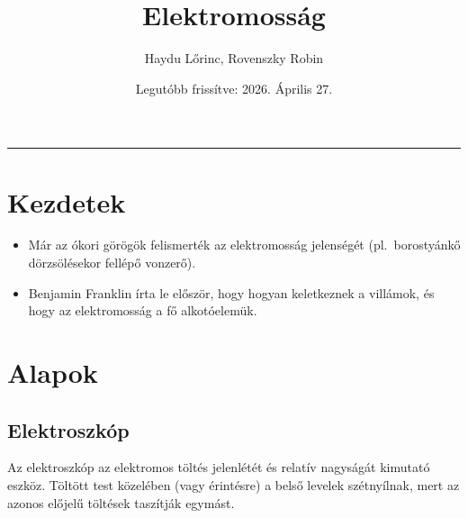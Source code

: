 \documentclass{article}
\title{\textbf{Elektromosság}}
\author{Haydu Lőrinc, Rovenszky Robin}
\date{Legutóbb frissítve: 2026. Április 27.}
\theoremstyle{definition}
\begin{document}
\maketitle
\tableofcontents
\vspace{10pt}
\hrule

\section{Kezdetek}

\begin{itemize}
    \item Már az ókori görögök felismerték az elektromosság jelenségét
          (pl.\ borostyánkő dörzsölésekor fellépő vonzerő).
    \item Benjamin Franklin írta le először, hogy hogyan keletkeznek a villámok,
          és hogy az elektromosság a fő alkotóelemük.
\end{itemize}

\section{Alapok}

\subsection{Elektroszkóp}

Az elektroszkóp az elektromos töltés jelenlétét és relatív nagyságát kimutató
eszköz. Töltött test közelében (vagy érintésre) a belső levelek szétnyílnak,
mert az azonos előjelű töltések taszítják egymást.

\begin{center}
\end{center}
\end{document}
